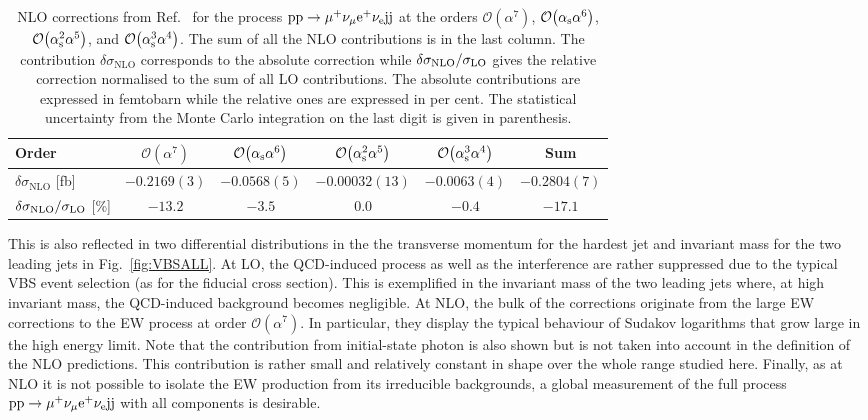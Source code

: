 \begin{table}
\begin{center}
\begin{tabular}{|l||c|c|c|c||c|}
\hline
Order & $\mathcal{O}{\left(\alpha^{7}\right)}$ & $\mathcal{O}{\left(\alpha_{\rm s}\alpha^{6}\right)}$ & $\mathcal{O}{\left(\alpha_{\rm s}^{2}\alpha^{5}\right)}$ & $\mathcal{O}{\left(\alpha_{\rm s}^{3}\alpha^{4}\right)}$ & Sum \\
\hline
\hline 
${\delta \sigma_{\mathrm{NLO}}}$ [fb] 
& $-0.2169(3)$ 
& $-0.0568(5)$
& $-0.00032(13)$
& $-0.0063(4)$ 
& $-0.2804(7)$ \\
\hline
$\delta \sigma_{\mathrm{NLO}}/\sigma_{\rm LO}$ [\%] & $-13.2$ & $-3.5$ & $0.0$ & $-0.4$ & $-17.1$ \\
\hline
\end{tabular}
\end{center}
\caption{
NLO corrections from Ref.~\cite{Biedermann:2017bss} for the process ${\rm p}{\rm p}\to\mu^+\nu_\mu{\rm e}^+\nu_{\rm e}{\rm j}{\rm j}$ at the orders 
$\mathcal{O}{\left(\alpha^{7}\right)}$, $\mathcal{O}{\left(\alpha_{\rm s}\alpha^{6}\right)}$, $\mathcal{O}{\left(\alpha_{\rm s}^{2}\alpha^{5}\right)}$, and $\mathcal{O}{\left(\alpha_{\rm s}^{3}\alpha^{4}\right)}$.
The sum of all the NLO contributions is in the last column.
The contribution $\delta\sigma_{\mathrm{NLO}}$ corresponds to the absolute correction while $\delta \sigma_{\mathrm{NLO}}/\sigma_{\rm LO}$ gives the relative correction normalised to the sum of all LO contributions.
The absolute contributions are expressed in femtobarn while the relative ones are expressed in per cent.
The statistical uncertainty from the Monte Carlo integration on the last digit is given in parenthesis.}
\label{table:NLOVBS}
\end{table}

This is also reflected in two differential distributions in the the transverse momentum for the hardest jet and invariant mass for the two leading jets in Fig.~\ref{fig:VBSALL}.
At LO, the QCD-induced process as well as the interference are rather suppressed due to the typical VBS event selection (as for the fiducial cross section).
This is exemplified in the invariant mass of the two leading jets where, at high invariant mass, the QCD-induced background becomes negligible.
At NLO, the bulk of the corrections originate from the large EW corrections to the EW process at order $\mathcal{O}{\left(\alpha^{7}\right)}$.
In particular, they display the typical behaviour of Sudakov logarithms that grow large in the high energy limit.
Note that the contribution from initial-state photon is also shown but is not taken into account in the definition of the NLO predictions.
This contribution is rather small and relatively constant in shape over the whole range studied here.
Finally, as at NLO it is not possible to isolate the EW production from its irreducible backgrounds, a global measurement of the full process ${\rm p}{\rm p}\to\mu^+\nu_\mu{\rm e}^+\nu_{\rm e}{\rm j}{\rm j}$ with all components is desirable.


